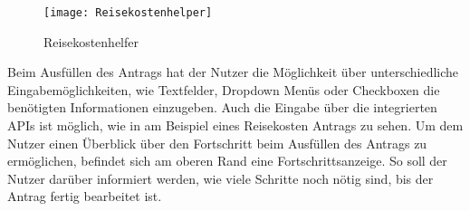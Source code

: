 \begin{figure}[h]
  \centering
    \texttt{[image: Reisekostenhelper]}
    \caption{Reisekostenhelfer}\label{Reisekostenhelfer}
\end{figure}


Beim Ausfüllen des Antrags hat der Nutzer die Möglichkeit über unterschiedliche Eingabemöglichkeiten,
wie Textfelder, Dropdown Menüs oder Checkboxen die benötigten Informationen einzugeben. Auch die Eingabe
über die integrierten APIs ist möglich, wie in  am Beispiel eines Reisekosten Antrags zu sehen.
Um dem Nutzer einen Überblick über den Fortschritt beim Ausfüllen des Antrags zu ermöglichen, befindet sich am oberen 
Rand eine Fortschrittsanzeige.
So soll der Nutzer darüber informiert werden, wie viele Schritte noch
nötig sind, bis der Antrag fertig bearbeitet ist. 



